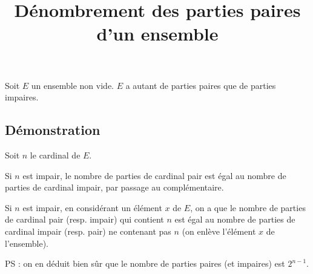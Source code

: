 \documentclass[fontsize=12pt,twoside=false,parskip=half]{scrartcl}
\title{Dénombrement des parties paires d’un ensemble}
\date{}
\author{}
\begin{document}
\maketitle
   \begin{Theoreme}
      Soit $E$ un ensemble non vide. $E$ a autant de parties paires que de parties impaires.
   \end{Theoreme}
   \subsection{Démonstration}
      
      Soit $n$ le cardinal de $E$. 
      
      Si $n$ est impair, le nombre de parties de cardinal pair est égal au nombre de parties de cardinal impair, 
      par passage au complémentaire. 
      
      Si $n$ est impair, en considérant un élément $x$ de $E$, on a  que le nombre de parties de cardinal pair 
      (resp. impair) qui contient $n$ est égal au nombre de parties de cardinal impair (resp. pair) ne contenant pas $n$
      (on enlève l’élément $x$ de l’ensemble).
      
      PS : on en déduit bien sûr que le nombre de parties paires (et impaires) est $2^{n - 1}$. 
\end{document}
